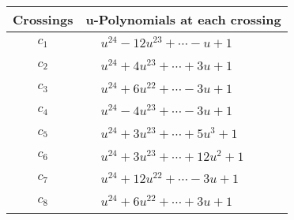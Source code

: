 \documentclass[1p]{elsarticle_modified}
\theoremstyle{definition}
\begin{document}
\begin{tabular}{m{50pt}|m{274pt}}
Crossings & \hspace{64pt}u-Polynomials at each crossing \\
\hline $$\begin{aligned}c_{1}\end{aligned}$$&$\begin{aligned}
&u^{24}-12 u^{23}+\cdots- u+1
\end{aligned}$\\
\hline $$\begin{aligned}c_{2}\end{aligned}$$&$\begin{aligned}
&u^{24}+4 u^{23}+\cdots+3 u+1
\end{aligned}$\\
\hline $$\begin{aligned}c_{3}\end{aligned}$$&$\begin{aligned}
&u^{24}+6 u^{22}+\cdots-3 u+1
\end{aligned}$\\
\hline $$\begin{aligned}c_{4}\end{aligned}$$&$\begin{aligned}
&u^{24}-4 u^{23}+\cdots-3 u+1
\end{aligned}$\\
\hline $$\begin{aligned}c_{5}\end{aligned}$$&$\begin{aligned}
&u^{24}+3 u^{23}+\cdots+5 u^3+1
\end{aligned}$\\
\hline $$\begin{aligned}c_{6}\end{aligned}$$&$\begin{aligned}
&u^{24}+3 u^{23}+\cdots+12 u^2+1
\end{aligned}$\\
\hline $$\begin{aligned}c_{7}\end{aligned}$$&$\begin{aligned}
&u^{24}+12 u^{22}+\cdots-3 u+1
\end{aligned}$\\
\hline $$\begin{aligned}c_{8}\end{aligned}$$&$\begin{aligned}
&u^{24}+6 u^{22}+\cdots+3 u+1
\end{aligned}$\\

\end{tabular}
\end{document}
